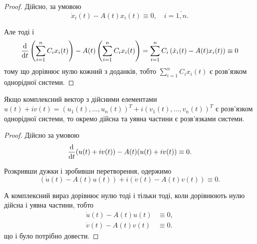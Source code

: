 \begin{proof}
	Дійсно, за умовою
	\begin{equation*}
		\dot x_i(t) - A(t) x_i(t) \equiv 0, \quad i = \overline{1, n}.
	\end{equation*}
	
	Але тоді і
	\begin{equation*}
		\frac{\mathop{}\!\mathrm{d}}{\mathop{}\!\mathrm{d} t} \left( \sum_{i=1}^n C_i x_i(t) \right) - A(t) \left( \sum_{i = 1}^n C_i x_i(t) \right) = \sum_{i = 1}^n C_i \left( \dot x_i(t) - A(t) x_i(t) \right) \equiv 0
	\end{equation*}
	тому що дорівнює нулю кожний з доданків, тобто $\sum_{i=1}^n C_i x_i(t)$ є роз\-в'яз\-ком однорідної системи.
\end{proof}

\begin{property}
	Якщо комплексний вектор з дійсними елементами $u(t) + i v(t) = (u_1(t), \ldots, u_n(t))^T + i (v_1(t), \ldots, v_n(t))^T$ є розв'язком однорідної системи, то окремо дійсна та уявна частини є розв'язками системи.
\end{property}

\begin{proof}
	Дійсно за умовою
	\begin{equation*}
		\frac{\mathop{}\!\mathrm{d}}{\mathop{}\!\mathrm{d} t} (u(t) + i v(t)) - A(t) (u(t) + i v(t)) \equiv 0.
	\end{equation*}

	Розкривши дужки і зробивши перетворення, одержимо
	\begin{equation*}
		(\dot u(t) - A(t) u(t)) + i (\dot v(t) - A(t) v(t)) \equiv 0.
	\end{equation*}
	 
	А комплексний вираз дорівнює нулю тоді і тільки тоді, коли дорівнюють нулю дійсна і уявна частини, тобто
	\begin{align*}
		\dot u(t) - A(t) u(t) &\equiv 0, \\
		\dot v(t) - A(t) v(t) &\equiv 0.
	\end{align*}
	що і було потрібно довести.
\end{proof}

